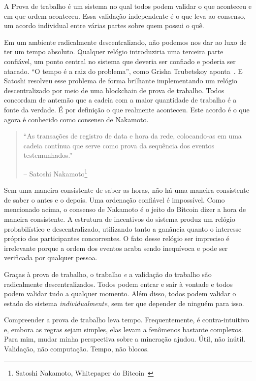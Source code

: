 A Prova de trabalho é um sistema no qual todos podem validar o que aconteceu e em que ordem aconteceu. Essa validação independente é o que leva ao consenso, um acordo individual entre várias partes sobre quem possui o quê.

Em um ambiente radicalmente descentralizado, não podemos nos dar ao luxo de ter um tempo absoluto. Qualquer relógio introduziria uma terceira parte confiável, um ponto central no sistema que deveria ser confiado e poderia ser atacado. \enquote{O tempo é a raiz do problema}, como Grisha Trubetskoy aponta~\cite{pow-clock}. E Satoshi resolveu esse problema de forma brilhante implementando um relógio descentralizado por meio de uma blockchain de prova de trabalho. Todos concordam de antemão que a cadeia com a maior quantidade de trabalho é a fonte da verdade. É por definição o que realmente aconteceu. Este acordo é o que agora é conhecido como consenso de Nakamoto.

\begin{quotation}\begin{samepage}
\enquote{As transações de registro de data e hora da rede, colocando-as em uma cadeia contínua que serve como prova da sequência dos eventos testemunhados.}
\begin{flushright} -- Satoshi Nakamoto\footnote{Satoshi Nakamoto, Whitepaper do Bitcoin~\cite{whitepaper}}
\end{flushright}\end{samepage}\end{quotation}

Sem uma maneira consistente de saber as horas, não há uma maneira consistente de saber o antes e o depois. Uma ordenação confiável é impossível. Como mencionado acima, o consenso de Nakamoto é o jeito do Bitcoin dizer a hora de maneira consistente. A estrutura de incentivos do sistema produz um relógio probabilístico e descentralizado, utilizando tanto a ganância quanto o interesse próprio dos participantes concorrentes. O fato desse relógio ser impreciso é irrelevante porque a ordem dos eventos acaba sendo inequívoca e pode ser verificada por qualquer pessoa.

Graças à prova de trabalho, o trabalho \textit{e} a validação do trabalho são radicalmente descentralizados. Todos podem entrar e sair à vontade e todos podem validar tudo a qualquer momento. Além disso, todos podem validar o estado do sistema \textit{individualmente}, sem ter que depender de ninguém para isso.

Compreender a prova de trabalho leva tempo. Frequentemente, é contra-intuitivo e, embora as regras sejam simples, elas levam a fenômenos bastante complexos. Para mim, mudar minha perspectiva sobre a mineração ajudou. Útil, não inútil. Validação, não computação. Tempo, não blocos.

